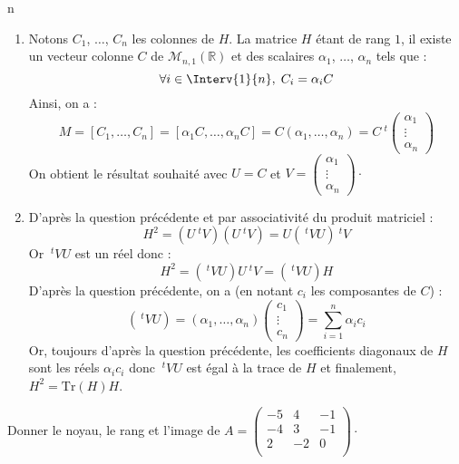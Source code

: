 n\documentclass[a4paper,10pt]{report}
\begin{document}
\begin{enumerate}
\item Notons $C_1$, $\ldots$, $C_n$ les colonnes de $H$. La matrice $H$ étant de rang $1$, il existe un vecteur colonne $C$ de $\mathcal{M}_{n,1}(\mathbb{R})$ et des scalaires $\alpha_1$, $\ldots$, $\alpha_n$ tels que :
$$ \forall i \in \Interv{1}{n}, \; C_i =\alpha_i C $$
Ainsi, on a :
$$ M = [C_1, \ldots, C_n] = [\alpha_1 C, \ldots, \alpha_n C] = C (\alpha_1, \ldots, \alpha_n) = C~^t \begin{pmatrix}
\alpha_1 \\
\vdots \\
\alpha_n
\end{pmatrix}$$
On obtient le résultat souhaité avec $U=C$ et $V = \begin{pmatrix}
\alpha_1 \\
\vdots \\
\alpha_n
\end{pmatrix} \cdot$
\item D'après la question précédente et par associativité du produit matriciel :
$$ H^2 = (U ~^tV) (U ~^tV) = U( ~^tVU )~^tV$$
Or $~^tVU$ est un réel donc :
$$ H^2 = (~^tVU ) U ~^tV =  (~^tVU ) H$$
D'après la question précédente, on a (en notant $c_i$ les composantes de $C$) :
$$ (~^tVU ) = (\alpha_1, \ldots, \alpha_n) \begin{pmatrix}
c_1 \\
\vdots \\
c_n
\end{pmatrix} = \sum_{i=1}^n \alpha_i c_i $$
Or, toujours d'après la question précédente, les coefficients diagonaux de $H$ sont les réels $\alpha_i c_i$ donc $~^tVU $ est égal à la trace de $H$ et finalement, $H^2 = \textrm{Tr}(H)H$.
\end{enumerate}

\begin{Exercice}{} Donner le noyau, le rang et l'image de $A = \begin{pmatrix}
-5 & 4 & -1 \\
-4 & 3 & - 1 \\
2 	 & -2 & 0 \\
\end{pmatrix}\cdot$
\end{Exercice}
\end{document}
